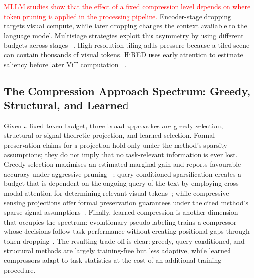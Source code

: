 \documentclass[10pt]{article}
\begin{document}
\textcolor{red}{MLLM studies show that the effect of a fixed compression level depends
on where token pruning is applied in the processing pipeline.}  Encoder-stage dropping targets visual
compute, while later dropping changes the context available to the language model.
Multistage strategies exploit this asymmetry by using different budgets across stages
~\citep{liu2024multistagevisiontokendropping}.  High-resolution tiling adds pressure
because a tiled scene can contain thousands of visual tokens.  HiRED uses early
attention to estimate saliency before later ViT computation
~\citep{arif2024hiredattentionguidedtokendropping}.

\subsection{The Compression Approach Spectrum: Greedy, Structural, and Learned}

Given a fixed token budget, three broad approaches are greedy selection, structural or
signal-theoretic projection, and learned selection.  Formal preservation claims for a
projection hold only under the method's sparsity assumptions; they do not imply that no
task-relevant information is ever lost.  Greedy selection maximises an estimated
marginal gain and reports favourable accuracy under aggressive pruning
~\citep{pei2025greedypruneretentingcriticalvisual}; query-conditioned
sparsification creates a budget that is dependent on the ongoing query of the text 
by employing cross-modal attention for determining relevant visual tokens~\citep{zhang2025sparsevlmvisualtokensparsification}; while
compressive-sensing projections offer formal preservation guarantees under the cited
method's sparse-signal assumptions~\citep{kiruluta2025csvlmcompressedsensingattention}.
Finally, learned compression is another dimension that occupies the spectrum:
evolutionary pseudo-labeling trains a compressor whose decisions follow task performance
without creating positional gaps through token dropping~\citep{song2026evocomplearningvisualtoken}.
The resulting trade-off is clear:
greedy, query-conditioned, and structural methods are largely training-free but less
adaptive, while learned compressors adapt to task statistics at the cost of an
additional training procedure.
\end{document}
